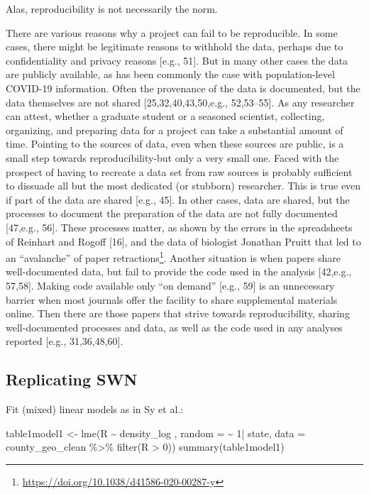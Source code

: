 \documentclass[10pt,letterpaper]{article}
\newenvironment{Shaded}{\begin{snugshade}}{\end{snugshade}}
\newcommand{\AttributeTok}[1]{\textcolor[rgb]{0.77,0.63,0.00}{#1}}
\newcommand{\DecValTok}[1]{\textcolor[rgb]{0.00,0.00,0.81}{#1}}
\newcommand{\FunctionTok}[1]{\textcolor[rgb]{0.00,0.00,0.00}{#1}}
\newcommand{\NormalTok}[1]{#1}
\newcommand{\OtherTok}[1]{\textcolor[rgb]{0.56,0.35,0.01}{#1}}
\newcommand{\SpecialCharTok}[1]{\textcolor[rgb]{0.00,0.00,0.00}{#1}}
\begin{document}
Alas, reproducibility is not necessarily the norm.

There are various reasons why a project can fail to be reproducible. In
some cases, there might be legitimate reasons to withhold the data,
perhaps due to confidentiality and privacy reasons {[}e.g., 51{]}. But
in many other cases the data are publicly available, as has been
commonly the case with population-level COVID-19 information. Often the
provenance of the data is documented, but the data themselves are not
shared {[}25,32,40,43,50,e.g., 52,53--55{]}. As any researcher can
attest, whether a graduate student or a seasoned scientist, collecting,
organizing, and preparing data for a project can take a substantial
amount of time. Pointing to the sources of data, even when these sources
are public, is a small step towards reproducibility-but only a very
small one. Faced with the prospect of having to recreate a data set from
raw sources is probably sufficient to dissuade all but the most
dedicated (or stubborn) researcher. This is true even if part of the
data are shared {[}e.g., 45{]}. In other cases, data are shared, but the
processes to document the preparation of the data are not fully
documented {[}47,e.g., 56{]}. These processes matter, as shown by the
errors in the spreadsheets of Reinhart and Rogoff {[}16{]}, and the data
of biologist Jonathan Pruitt that led to an ``avalanche'' of paper
retractions\footnote{\url{https://doi.org/10.1038/d41586-020-00287-y}}.
Another situation is when papers share well-documented data, but fail to
provide the code used in the analysis {[}42,e.g., 57,58{]}. Making code
available only ``on demand'' {[}e.g., 59{]} is an unnecessary barrier
when most journals offer the facility to share supplemental materials
online. Then there are those papers that strive towards reproducibility,
sharing well-documented processes and data, as well as the code used in
any analyses reported {[}e.g., 31,36,48,60{]}.

\hypertarget{replicating-swn}{%
\subsection{Replicating SWN}\label{replicating-swn}}

Fit (mixed) linear models as in Sy et al.:

\begin{Shaded}
\begin{Highlighting}[]
\NormalTok{table1model1 }\OtherTok{\textless{}{-}} \FunctionTok{lme}\NormalTok{(R }\SpecialCharTok{\textasciitilde{}}\NormalTok{ density\_log , }
                    \AttributeTok{random =} \SpecialCharTok{\textasciitilde{}} \DecValTok{1}\SpecialCharTok{|}\NormalTok{ state, }
                    \AttributeTok{data =}\NormalTok{ county\_geo\_clean }\SpecialCharTok{\%\textgreater{}\%}
                      \FunctionTok{filter}\NormalTok{(R }\SpecialCharTok{\textgreater{}} \DecValTok{0}\NormalTok{))}
\FunctionTok{summary}\NormalTok{(table1model1)}
\end{Highlighting}
\end{Shaded}
\end{document}
